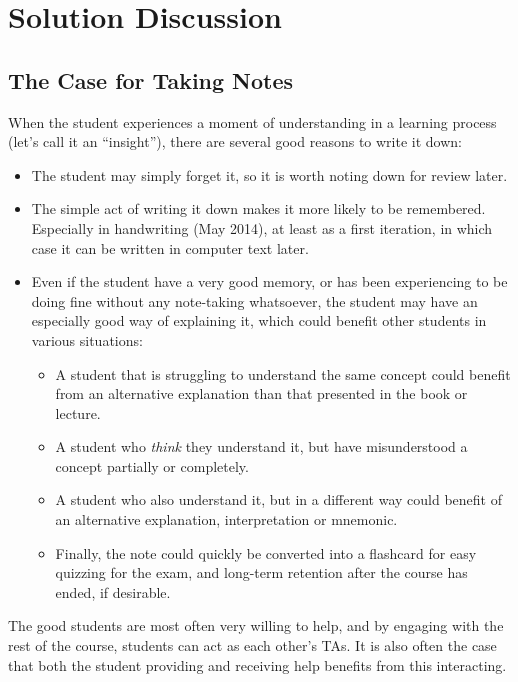 \pagebreak

\section{Solution Discussion}\label{solution-discussion}

\subsection{The Case for Taking Notes}\label{the-case-for-taking-notes}

When the student experiences a moment of understanding in a learning
process (let's call it an ``insight''), there are several good reasons
to write it down:

\begin{itemize}
\tightlist
\item
  The student may simply forget it, so it is worth noting down for
  review later.
\item
  The simple act of writing it down makes it more likely to be
  remembered. Especially in handwriting (May 2014), at least as a first
  iteration, in which case it can be written in computer text later.
\item
  Even if the student have a very good memory, or has been experiencing
  to be doing fine without any note-taking whatsoever, the student may
  have an especially good way of explaining it, which could benefit
  other students in various situations:

  \begin{itemize}
  \tightlist
  \item
    A student that is struggling to understand the same concept could
    benefit from an alternative explanation than that presented in the
    book or lecture.
  \item
    A student who \emph{think} they understand it, but have
    misunderstood a concept partially or completely.
  \item
    A student who also understand it, but in a different way could
    benefit of an alternative explanation, interpretation or mnemonic.
  \item
    Finally, the note could quickly be converted into a flashcard for
    easy quizzing for the exam, and long-term retention after the course
    has ended, if desirable.
  \end{itemize}
\end{itemize}

The good students are most often very willing to help, and by engaging
with the rest of the course, students can act as each other's TAs. It is
also often the case that both the student providing and receiving help
benefits from this interacting.

